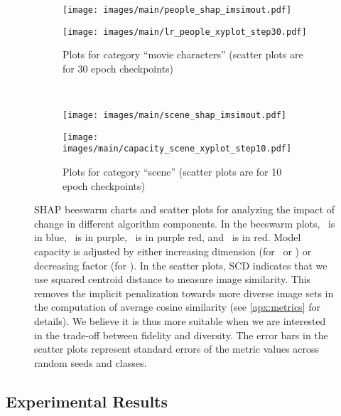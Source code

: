 \begin{figure}
    \centering
    \begin{subfigure}{\textwidth}
    \begin{adjustbox}{valign=t}
    \texttt{[image: images/main/people\_shap\_imsimout.pdf]}
    \end{adjustbox}
    \begin{adjustbox}{valign=t}
    \texttt{[image: images/main/lr\_people\_xyplot\_step30.pdf]}
    \end{adjustbox}
    \caption{Plots for category ``movie characters'' (scatter plots are for 30 epoch checkpoints)}
    \label{subfig:main-people}
    \end{subfigure}
    \\[0.2cm]
    \begin{subfigure}{\textwidth}
    \begin{adjustbox}{valign=t}
    \texttt{[image: images/main/scene\_shap\_imsimout.pdf]}
    \end{adjustbox}
    \begin{adjustbox}{valign=t}
    \texttt{[image: images/main/capacity\_scene\_xyplot\_step10.pdf]}
    \end{adjustbox}
    \caption{Plots for category ``scene'' (scatter plots are for 10 epoch checkpoints)}
    \label{subfig:main-scene}
    \end{subfigure}
    \caption{SHAP beeswarm charts and scatter plots for analyzing the impact of change in different algorithm components.
    In the beeswarm plots, \lora~is in blue, \loha~is in purple, \lokr~is in purple red, and \nt~is in red.
    Model capacity is adjusted by either increasing dimension (for \lora~or \loha) or decreasing factor (for \lokr).
    In the scatter plots, SCD indicates that we use squared centroid distance to measure image similarity.
    This removes the implicit penalization towards more diverse image sets in the computation of average cosine similarity (see \cref{apx:metrics} for details). We believe it is thus more suitable when we are interested in the trade-off between fidelity and diversity.
    The error bars in the scatter plots represent standard errors of the metric values across random seeds and classes.
    }
    \label{fig:plots-main}
    \vspace*{-0.8em}
\end{figure}

\subsection{Experimental Results}
\label{subsec:exp-results}

